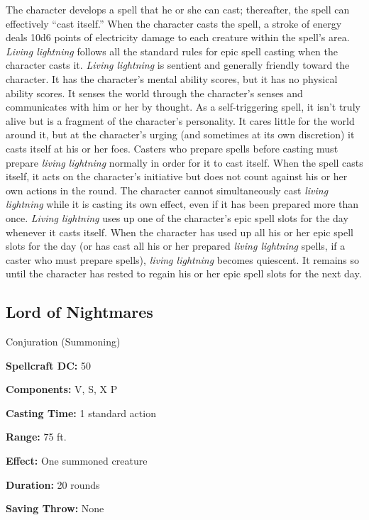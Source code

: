 \documentclass{article}
\begin{document}
The character develops a spell that he or she can cast; thereafter, the spell can 
effectively ``cast itself.'' When the character casts the spell, a stroke of energy 
deals 10d6 points of electricity damage to each creature within the spell's area. 
\textit{Living lightning }follows all the standard rules for epic spell casting 
when the character casts it. \textit{Living lightning }is sentient and generally 
friendly toward the character. It has the character's mental ability scores, but 
it has no physical ability scores. It senses the world through the character's 
senses and communicates with him or her by thought. As a self-triggering spell, 
it isn't truly alive but is a fragment of the character's personality. It cares 
little for the world around it, but at the character's urging (and sometimes at 
its own discretion) it casts itself at his or her foes. Casters who prepare spells 
before casting must prepare \textit{living lightning }normally in order for it 
to cast itself. When the spell casts itself, it acts on the character's initiative 
but does not count against his or her own actions in the round. The character cannot 
simultaneously cast \textit{living lightning }while it is casting its own effect, 
even if it has been prepared more than once. \textit{Living lightning }uses up 
one of the character's epic spell slots for the day whenever it casts itself. When 
the character has used up all his or her epic spell slots for the day (or has cast 
all his or her prepared \textit{living lightning }spells, if a caster who must 
prepare spells), \textit{living lightning }becomes quiescent. It remains so until 
the character has rested to regain his or her epic spell slots for the next day. 

\vspace{12pt}
\subsection*{Lord of Nightmares }

Conjuration (Summoning) 

\textbf{Spellcraft DC:} 50 

\textbf{Components:} V, S, X P 

\textbf{Casting Time:} 1 standard action 

\textbf{Range:} 75 ft. 

\textbf{Effect:} One summoned creature 

\textbf{Duration:} 20 rounds 

\textbf{Saving Throw:} None 
\end{document}
